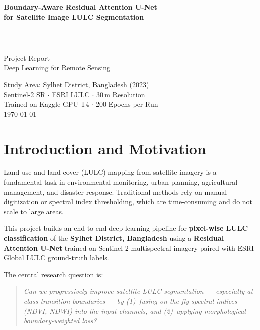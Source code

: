 \documentclass[12pt,a4paper]{article}
\begin{document}
\begin{titlepage}
  \centering
  \vspace*{2cm}
  {\LARGE\bfseries\color{myblue}
    Boundary-Aware Residual Attention U-Net\\[0.5em]
    for Satellite Image LULC Segmentation\par}
  \vspace{1.5cm}
  \rule{0.7\linewidth}{0.8pt}\\[1cm]
  {\large Project Report\\[0.4em]
   Deep Learning for Remote Sensing\par}
  \vspace{1.5cm}
  {\normalsize
    Study Area: Sylhet District, Bangladesh (2023)\\
    Sentinel-2 SR $\cdot$ ESRI LULC $\cdot$ 30\,m Resolution\\
    Trained on Kaggle GPU T4 $\cdot$ 200 Epochs per Run\\[1em]
    \today\par}
  \vfill
\end{titlepage}

\tableofcontents
\newpage

\section{Introduction and Motivation}

Land use and land cover (LULC) mapping from satellite imagery is a
fundamental task in environmental monitoring, urban planning, agricultural
management, and disaster response. Traditional methods rely on manual
digitization or spectral index thresholding, which are time-consuming and do
not scale to large areas.

This project builds an end-to-end deep learning pipeline for
\textbf{pixel-wise LULC classification} of the \textbf{Sylhet District,
Bangladesh} using a \textbf{Residual Attention U-Net} trained on
Sentinel-2 multispectral imagery paired with ESRI Global LULC ground-truth
labels.

The central research question is:

\begin{quote}
\itshape
Can we progressively improve satellite LULC segmentation — especially at
class transition boundaries — by (1)~fusing on-the-fly spectral indices
(NDVI, NDWI) into the input channels, and (2)~applying morphological
boundary-weighted loss?
\end{quote}
\end{document}
